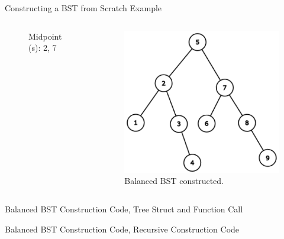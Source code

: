 \documentclass[aspectratio=169]{beamer}%
\begin{document}
\begin{frame}{Constructing a BST from Scratch Example}
\begin{columns}
\begin{column}{0.32\textwidth}
\begin{figure}
                    \caption{Midpoint(s): 2, 7}
                \end{figure}
            \end{column}
            \hfill
            \begin{column}{0.32\textwidth}
                \begin{figure}
                    \centering
                    \includegraphics[width = .9\linewidth]{const_bst3.png}
                    \caption{Balanced BST constructed.}
                \end{figure}
            \end{column}
    \end{columns}
\end{frame}

\begin{frame}{Balanced BST Construction Code, Tree Struct and Function Call}
    
\end{frame}

\begin{frame}{Balanced BST Construction Code, Recursive Construction Code}
    
\end{frame}
\end{document}
